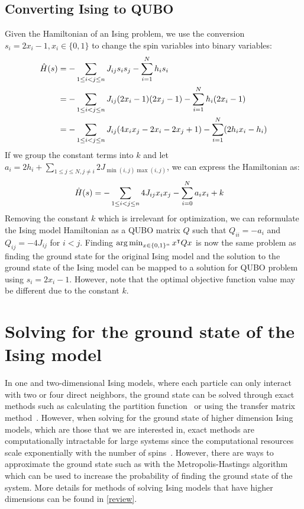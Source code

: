 \subsection{Converting Ising to QUBO}\label{isingtoqubo}
Given the Hamiltonian of an Ising problem, we use the conversion $s_i = 2x_i - 1, x_i \in \{0, 1\}$ to change the spin variables into binary variables:
\begin{align}
    \Hat{H}(s) &= -\sum_{1\leq i < j \leq n} J_{ij}s_i s_j - \sum_{i=1}^N h_i s_i \nonumber\\
    &= -\sum_{1\leq i < j \leq n} J_{ij}(2x_i - 1) (2x_j - 1) - \sum_{i=1}^N h_i (2x_i - 1) \nonumber\\
    &= -\sum_{1\leq i < j \leq n} J_{ij}(4x_i x_j - 2x_i - 2x_j + 1) - \sum_{i=1}^N (2h_i x_i - h_i) \nonumber
\end{align}
If we group the constant terms into $k$ and let $a_i = 2h_i + \sum_{1\leq j \leq N, j \neq i} 2J_{\min(i,j)\max(i,j)}$, we can express the Hamiltonian as:
\begin{align}
    \Hat{H}(s) &= -\sum_{1\leq i < j \leq n} 4J_{ij}x_i x_j - \sum_{i=0}^N a_{i}x_i + k \nonumber
\end{align}
Removing the constant $k$ which is irrelevant for optimization, we can reformulate the Ising model Hamiltonian as a QUBO matrix $Q$ such that $Q_{ii} = -a_i$ and $Q_{ij} = -4J_{ij}$ for $i < j$. Finding $\operatorname*{arg\,min}_{x \in \{0, 1\}^n} x^\intercal Q x$ is now the same problem as finding the ground state for the original Ising model and the solution to the ground state of the Ising model can be mapped to a solution for QUBO problem using $s_i = 2x_i - 1$. However, note that the optimal objective function value may be different due to the constant $k$.

\section{Solving for the ground state of the Ising model}
In one and two-dimensional Ising models, where each particle can only interact with two or four direct neighbors, the ground state can be solved through exact methods such as calculating the partition function~\cite{onsager} or using the transfer matrix method~\cite{kramerising}. However, when solving for the ground state of higher dimension Ising models, which are those that we are interested in, exact methods are computationally intractable for large systems since the computational resources scale exponentially with the number of spins~\cite{barahona1982computational}. However, there are ways to approximate the ground state such as with the Metropolis-Hastings algorithm \cite{metropolissampling} which can be used to increase the probability of finding the ground state of the system. More details for methods of solving Ising models that have higher dimensions can be found in \autoref{review}.

